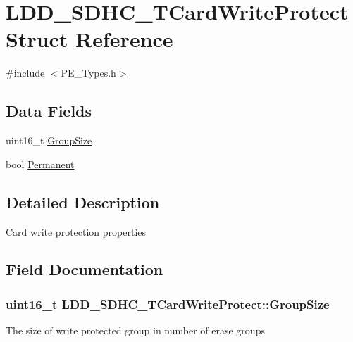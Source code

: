 \hypertarget{struct_l_d_d___s_d_h_c___t_card_write_protect}{}\section{L\+D\+D\+\_\+\+S\+D\+H\+C\+\_\+\+T\+Card\+Write\+Protect Struct Reference}
\label{struct_l_d_d___s_d_h_c___t_card_write_protect}


{\ttfamily \#include $<$P\+E\+\_\+\+Types.\+h$>$}

\subsection*{Data Fields}
\begin{DoxyCompactItemize}
\item 
uint16\+\_\+t \hyperlink{struct_l_d_d___s_d_h_c___t_card_write_protect_ae05b5dd538cf47f5ec24559246415306}{Group\+Size}
\item 
bool \hyperlink{struct_l_d_d___s_d_h_c___t_card_write_protect_aff6b0178087c770234bd68974d643552}{Permanent}
\end{DoxyCompactItemize}


\subsection{Detailed Description}
Card write protection properties 

\subsection{Field Documentation}
\hypertarget{struct_l_d_d___s_d_h_c___t_card_write_protect_ae05b5dd538cf47f5ec24559246415306}{}
\subsubsection[{Group\+Size}]{\setlength{\rightskip}{0pt plus 5cm}uint16\+\_\+t L\+D\+D\+\_\+\+S\+D\+H\+C\+\_\+\+T\+Card\+Write\+Protect\+::\+Group\+Size}\label{struct_l_d_d___s_d_h_c___t_card_write_protect_ae05b5dd538cf47f5ec24559246415306}
The size of write protected group in number of erase groups \hypertarget{struct_l_d_d___s_d_h_c___t_card_write_protect_aff6b0178087c770234bd68974d643552}{}
